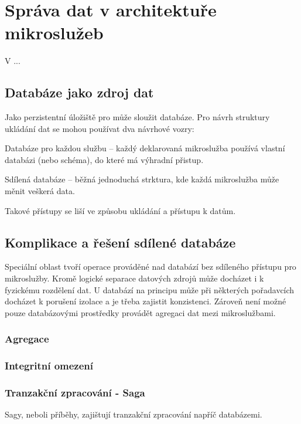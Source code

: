 \chapter{Správa dat v architektuře mikroslužeb}\label{ch:msa-data}


V ...


\section{Databáze jako zdroj dat}\label{sec:msa-db-as-data-source}

Jako perzistentní úložiště pro  může sloužit databáze.
Pro návrh struktury ukládání dat se mohou používat dva návrhové vozry:
\begin{dl}
   \item [Databáze pro každou službu] – každý deklarovaná mikroslužba používá vlastní databázi (nebo schéma), do které má výhradní přistup.
   \item [Sdílená databáze] – běžná jednoduchá strktura, kde každá mikroslužba může měnit veškerá data.
\end{dl}

Takové přístupy se liší ve způsobu ukládání a přístupu k datům.




\section{Komplikace a řešení sdílené databáze}\label{sec:msa-db-issues}

Speciální oblast tvoří operace prováděné nad databází bez sdíleného přístupu pro mikroslužby.
Kromě logické separace datových zdrojů může docházet i k fyzickému rozdělení dat.
U databází na principu  může při některých pořadavcích docházet k porušení izolace a je třeba zajistit konzistenci.
Zároveň není možné pouze databázovými prostředky provádět agregaci dat mezi mikroslužbami.

\subsection{Agregace}\label{subsec:msa-db-aggregate}

\subsection{Integritní omezení}\label{subsec:msa-db-integrity}
\subsection{Tranzakční zpracování - Saga}\label{subsec:msa-db-transaction}
Sagy, neboli příběhy, zajištují tranzakční zpracování napříč databázemi.
